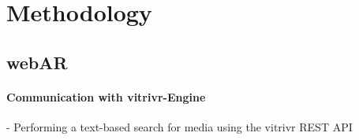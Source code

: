 \chapter{Methodology}

\section{webAR}

\subsubsection{Communication with vitrivr-Engine}

- Performing a text-based search for media using the vitrivr REST API \cite{noauthor_example_nodate}

